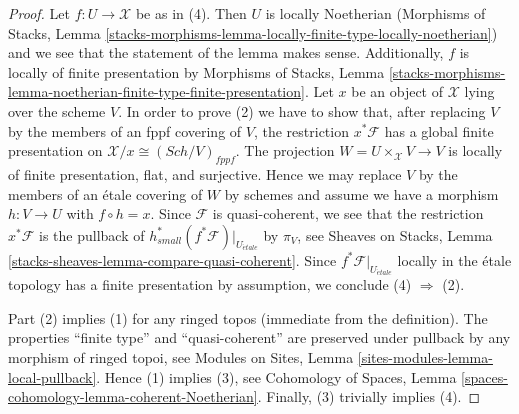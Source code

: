 \documentclass[10pt,a4paper]{amsart}
\theoremstyle{plain}
\theoremstyle{definition}
\theoremstyle{remark}
\numberwithin{equation}{subsection}
\def\Sch{\mathit{Sch}}
\def\etale{{\acute{e}tale}}
\begin{document}
\begin{proof}
Let $f : U \to \mathcal{X}$ be as in (4).
Then $U$ is locally Noetherian (Morphisms of Stacks, Lemma
\ref{stacks-morphisms-lemma-locally-finite-type-locally-noetherian})
and we see that the statement of the lemma makes sense. Additionally,
$f$ is locally of finite presentation by Morphisms of Stacks, Lemma
\ref{stacks-morphisms-lemma-noetherian-finite-type-finite-presentation}.
Let $x$ be an object of $\mathcal{X}$ lying over the scheme $V$.
In order to prove (2) we have to show that, after replacing $V$
by the members of an fppf covering of $V$, the restriction $x^*\mathcal{F}$
has a global finite presentation on $\mathcal{X}/x \cong (\Sch/V)_{fppf}$.
The projection $W = U \times_\mathcal{X} V \to V$ is
locally of finite presentation, flat, and surjective.
Hence we may replace $V$ by the members of an \'etale covering of $W$
by schemes and assume we have a morphism $h : V \to U$ with $f \circ h = x$.
Since $\mathcal{F}$ is quasi-coherent, we see that
the restriction $x^*\mathcal{F}$
is the pullback of $h_{small}^*(f^*\mathcal{F})|_{U_\etale}$
by $\pi_V$, see Sheaves on Stacks, Lemma
\ref{stacks-sheaves-lemma-compare-quasi-coherent}.
Since $f^*\mathcal{F}|_{U_\etale}$ locally in the
\'etale topology has a finite presentation by assumption, we conclude
(4) $\Rightarrow$ (2).

\medskip\noindent
Part (2) implies (1) for any ringed topos (immediate from the definition).
The properties ``finite type'' and ``quasi-coherent''
are preserved under pullback by any morphism of ringed topoi, see
Modules on Sites, Lemma \ref{sites-modules-lemma-local-pullback}.
Hence (1) implies (3), see Cohomology of Spaces, Lemma
\ref{spaces-cohomology-lemma-coherent-Noetherian}.
Finally, (3) trivially implies (4).
\end{proof}
\end{document}
